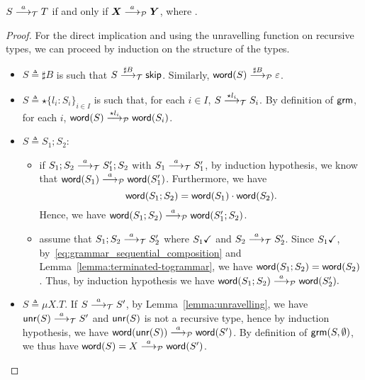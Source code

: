 \begin{lemma}
  \label{lem:transitions_mimic}
  $S \LTSderives T$ if and only if $\vec X \LTSderivesP \vec Y$, 
  where \grmcontext.
\end{lemma}
%
\begin{proof}
	For the direct implication and using the unravelling
	function on recursive types, we can proceed by induction
	on the structure of the types. 
	
	\begin{itemize}
		\item $S\triangleq\sharp B$ is such that $S \LTSderives[\sharp B] \skipk$.
		Similarly, $\word(S) \LTSderivesP[\sharp B] \varepsilon$.
		\item $S\triangleq\star\{l_i\colon S_i\}_{i\in I}$ is such that, for each $i\in I$,
		$S \LTSderives[\star l_i] S_i$. By definition of $\grm$, for each $i$, 
		$\word(S) \LTSderivesP[\star l_i] \word(S_i)$.
		\item $S\triangleq S_1;S_2$:
		\begin{itemize}
			\item if $S_1;S_2\LTSderives S_1';S_2$ with $S_1\LTSderives S_1'$,
			by induction hypothesis, we know that $\word(S_1) \LTSderivesP \word(S_1')$.
			Furthermore, we have
			\begin{equation}
			\label{eq:grammar_sequential_composition}
				\word(S_1;S_2) = \word(S_1)\cdot\word(S_2).	
			\end{equation}
			Hence, we have $\word(S_1;S_2) \LTSderivesP \word(S_1';S_2)$.
			\item assume that $S_1;S_2\LTSderives S_2'$ where 
				$\DONE{S_1}$ and $S_2\LTSderives S_2'$.
			Since $\DONE{S_1}$, 
			by~\eqref{eq:grammar_sequential_composition} and
			Lemma~\ref{lemma:terminated-togrammar}, 
			we have $\word(S_1;S_2) = \word(S_2)$.
			Thus, by induction hypothesis we have 
			$\word(S_1;S_2) \LTSderivesP \word(S_2').$
		\end{itemize}
		\item $S\triangleq\mu X.T$. If $S\LTSderives S'$, by Lemma~\ref{lemma:unravelling},
		we have $\Unravel(S) \LTSderives S'$ and $\Unravel(S)$ is not a recursive
		type, hence by induction hypothesis, we have
		$\word(\Unravel(S))\LTSderivesP \word(S')$.
		By definition of $\grm(S,\emptyset)$, we thus have
		$\word(S) = X \LTSderivesP \word(S')$. \smallskip
	\end{itemize}

\end{proof}
